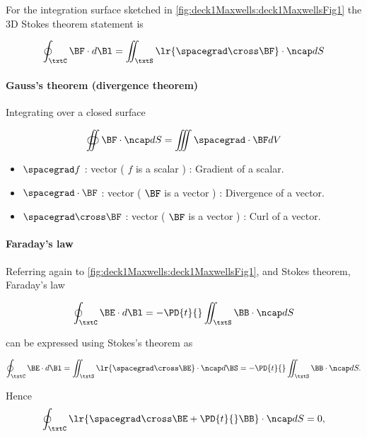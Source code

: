 For the integration surface sketched in \cref{fig:deck1Maxwells:deck1MaxwellsFig1} the 3D Stokes theorem statement is

\begin{dmath}\label{eqn:uwavesLecture1:140}
\oint_\txtC \BF \cdot d\Bl = \iint_\txtS \lr{ \spacegrad \cross \BF } \cdot \ncap dS
\end{dmath}

\paragraph{Gauss's theorem (divergence theorem)}

Integrating over a closed surface

\begin{dmath}\label{eqn:uwavesLecture1:160}
\oiint \BF \cdot \ncap dS = \iiint \spacegrad \cdot \BF dV
\end{dmath}

\begin{itemize}
\item \( \spacegrad f \) :  vector ( \( f \) is a scalar ) : Gradient of a scalar.
\item \( \spacegrad \cdot \BF \) :  vector ( \( \BF \) is a vector ) : Divergence of a vector.
\item \( \spacegrad \cross \BF \) :  vector ( \( \BF \) is a vector ) : Curl of a vector.
\end{itemize}

\paragraph{Faraday's law}

Referring again to \cref{fig:deck1Maxwells:deck1MaxwellsFig1}, and Stokes theorem, Faraday's law

\begin{dmath}\label{eqn:uwavesLecture1:180}
\oint_\txtC \BE \cdot d\Bl = - \PD{t}{} \iint_\txtS \BB \cdot \ncap dS
\end{dmath}

can be expressed using Stokes's theorem as

\begin{dmath}\label{eqn:uwavesLecture1:200}
\oint_\txtC \BE \cdot d\Bl = \iint_\txtS \lr{ \spacegrad \cross \BE} \cdot \ncap d\BS
=
- \PD{t}{} \iint_\txtS \BB \cdot \ncap dS.
\end{dmath}

Hence
\begin{dmath}\label{eqn:uwavesLecture1:220}
\oint_\txtC
\lr{
\spacegrad \cross \BE
+ \PD{t}{} \BB
}
\cdot \ncap dS
= 0,
\end{dmath}

